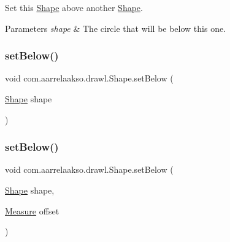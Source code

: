 Set this \hyperlink{classcom_1_1aarrelaakso_1_1drawl_1_1_shape}{Shape} above another \hyperlink{classcom_1_1aarrelaakso_1_1drawl_1_1_shape}{Shape}. 


\begin{DoxyParams}{Parameters}
{\em shape} & The circle that will be below this one. \\
\hline
\end{DoxyParams}
\mbox{\label{classcom_1_1aarrelaakso_1_1drawl_1_1_shape_aa0ec0030515b5096820e4dd030c0b320}} 
\subsubsection{\texorpdfstring{set\+Below()}{setBelow()}\hspace{0.1cm}{\footnotesize\ttfamily [1/2]}}
{\footnotesize\ttfamily void com.\+aarrelaakso.\+drawl.\+Shape.\+set\+Below (\begin{DoxyParamCaption}\item[{\hyperlink{classcom_1_1aarrelaakso_1_1drawl_1_1_shape}{Shape}}]{shape }\end{DoxyParamCaption})}

\mbox{\label{classcom_1_1aarrelaakso_1_1drawl_1_1_shape_aa0dd6332c22877c42b8c3863e5cc579e}} 
\subsubsection{\texorpdfstring{set\+Below()}{setBelow()}\hspace{0.1cm}{\footnotesize\ttfamily [2/2]}}
{\footnotesize\ttfamily void com.\+aarrelaakso.\+drawl.\+Shape.\+set\+Below (\begin{DoxyParamCaption}\item[{\hyperlink{classcom_1_1aarrelaakso_1_1drawl_1_1_shape}{Shape}}]{shape,  }\item[{\hyperlink{classcom_1_1aarrelaakso_1_1drawl_1_1_measure}{Measure}}]{offset }\end{DoxyParamCaption})}



